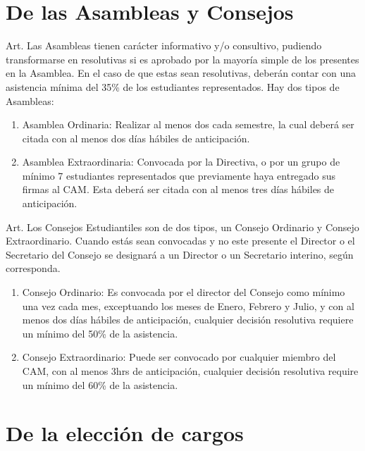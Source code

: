 \documentclass[letterpaper,11pt]{article}
\newcounter{art}
\newenvironment{art}{
    Art.\refstepcounter{art} \theart\:
}{}
\begin{document}
\section{De las Asambleas y Consejos}\label{asambleasConsejos}
\begin{art}\label{asambleas}
    Las Asambleas tienen carácter informativo y/o consultivo, pudiendo transformarse en resolutivas si es aprobado por la mayoría simple de los presentes en la Asamblea. En el caso de que estas sean resolutivas, deberán contar con una asistencia mínima del 35\% de los estudiantes representados. Hay dos tipos de Asambleas:
    \begin{enumerate}
        \item Asamblea Ordinaria: Realizar al menos dos cada semestre, la cual deberá ser citada con al menos dos días hábiles de anticipación.
        \item Asamblea Extraordinaria: Convocada por la Directiva, o por un grupo de mínimo 7 estudiantes representados que previamente haya entregado sus firmas al CAM. Esta deberá ser citada con al menos tres días hábiles de anticipación.%
    \end{enumerate}
\end{art}

\begin{art}\label{consejos}
    Los Consejos Estudiantiles son de dos tipos, un Consejo Ordinario y Consejo Extraordinario. Cuando estás sean convocadas y no este presente el Director o el Secretario del Consejo se designará a un Director o un Secretario interino, según corresponda.
    \begin{enumerate}
        \item Consejo Ordinario: Es convocada por el director del Consejo como mínimo una vez cada mes, exceptuando los meses de Enero, Febrero y Julio, y con al menos dos días hábiles de anticipación, cualquier decisión resolutiva requiere un mínimo del 50\% de la asistencia.
        \item Consejo Extraordinario: Puede ser convocado por cualquier miembro del CAM, con al menos 3hrs de anticipación, cualquier decisión resolutiva require un mínimo del 60\% de la asistencia.
    \end{enumerate}
\end{art}

\section{De la elección de cargos}\label{elecciones}
\end{document}
